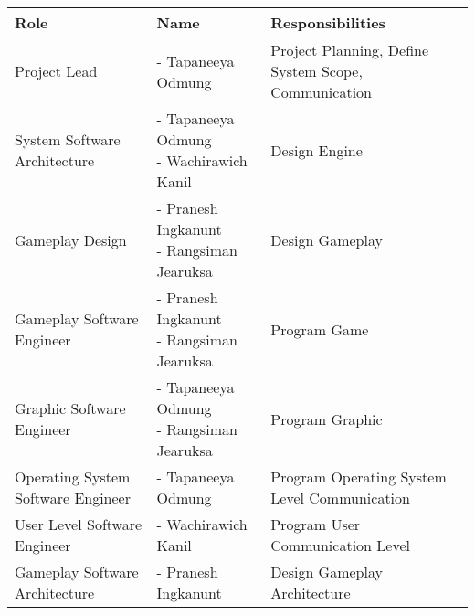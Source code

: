 \small
\begin{minipage}{\textwidth}
    \begin{tabularx}{\textwidth}{|L|L|L|}
        \hline
        \textbf{Role} & \textbf{Name} & \textbf{Responsibilities} \\
        \hline
        Project Lead & - Tapaneeya Odmung & Project Planning, Define System Scope, Communication \\
        System Software Architecture & {- Tapaneeya Odmung \newline - Wachirawich Kanil} & Design Engine \\
        Gameplay Design & {- Pranesh Ingkanunt \newline - Rangsiman Jearuksa} & Design Gameplay \\
        Gameplay Software Engineer & {- Pranesh Ingkanunt \newline - Rangsiman Jearuksa} & Program Game \\
        Graphic Software Engineer & {- Tapaneeya Odmung \newline - Rangsiman Jearuksa} & Program Graphic \\
        Operating System Software Engineer & - Tapaneeya Odmung & Program Operating System Level Communication \\
        User Level Software Engineer & - Wachirawich Kanil & Program User Communication Level \\
        Gameplay Software Architecture & - Pranesh Ingkanunt & Design Gameplay Architecture \\
        \hline
    \end{tabularx}
\end{minipage}
\label{tab:table}
